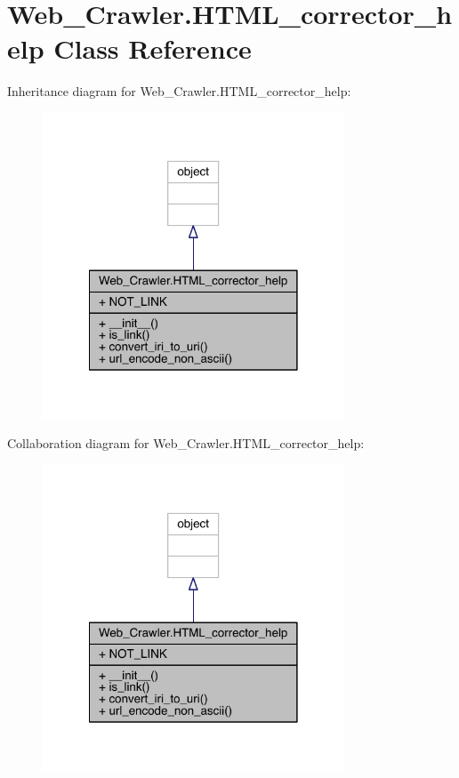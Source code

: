 \hypertarget{class_web___crawler_1_1_h_t_m_l__corrector__help}{}\section{Web\+\_\+\+Crawler.\+H\+T\+M\+L\+\_\+corrector\+\_\+help Class Reference}
\label{class_web___crawler_1_1_h_t_m_l__corrector__help}


Inheritance diagram for Web\+\_\+\+Crawler.\+H\+T\+M\+L\+\_\+corrector\+\_\+help\+:
\nopagebreak
\begin{figure}[H]
\begin{center}
\leavevmode
\includegraphics[width=254pt]{class_web___crawler_1_1_h_t_m_l__corrector__help__inherit__graph}
\end{center}
\end{figure}


Collaboration diagram for Web\+\_\+\+Crawler.\+H\+T\+M\+L\+\_\+corrector\+\_\+help\+:
\nopagebreak
\begin{figure}[H]
\begin{center}
\leavevmode
\includegraphics[width=254pt]{class_web___crawler_1_1_h_t_m_l__corrector__help__coll__graph}
\end{center}
\end{figure}
